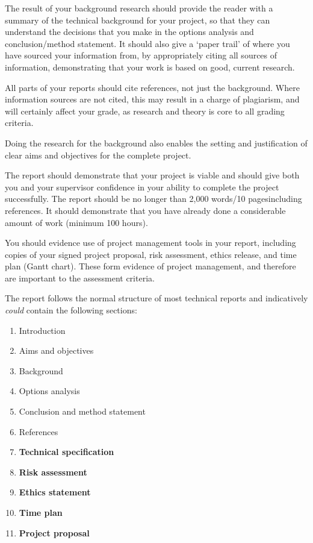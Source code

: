 The result of your background research should provide the reader with a summary of the technical background for your project, so that they can understand the decisions that you make in the options analysis and conclusion/method statement. It should also give a ‘paper trail’ of where you have sourced your information from, by appropriately citing all sources of information, demonstrating that your work is based on good, current research. 

All parts of your reports should cite references, not just the background. Where information sources
are not cited, this may result in a charge of plagiarism, and will certainly affect your grade, as research
and theory is core to all grading criteria.

Doing the research for the background also enables the setting and justification of clear aims and objectives for the complete project.

The report should demonstrate that your project is viable and should give both you and your supervisor confidence in your ability to complete the project successfully. The report should be no longer than 2,000 words/10 pagesincluding references. It should demonstrate that you have already done a considerable amount of work (minimum 100 hours).

You should evidence use of project management tools in your report, including copies of your signed project proposal, risk assessment, ethics release, and time plan (Gantt chart). These form evidence of project management, and therefore are important to the assessment criteria. 

The report follows the normal structure of most technical reports and indicatively \textit{could} contain the following sections:

\begin{enumerate}
    \item Introduction
    \item Aims and objectives
    \item Background
    \item Options analysis
    \item Conclusion and method statement
    \item References
    \item \textbf{Technical specification}
    \item \textbf{Risk assessment}
    \item \textbf{Ethics statement}
    \item \textbf{Time plan}
    \item \textbf{Project proposal}
\end{enumerate}

